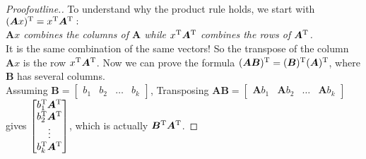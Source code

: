 \begin{proof}[Proofoutline.]
To understand why the product rule holds, we start with $(\bm{A}x)^{\mathrm T} = x^{\mathrm T}\bm A^{\mathrm T}:$\\
\emph{$\bm{A}x$ combines the columns of $\bm A$ while $x^{\mathrm T}\bm A^{\mathrm T}$ combines the rows of $\bm A^{\mathrm T}$.}\\
It is the same combination of the same vectors! So the transpose of the column $\bm{A}x$ is the row $x^{\mathrm T}\bm A^{\mathrm T}$. Now we can prove the formula $(\bm{AB})^{\mathrm T} = (\bm B)^{\mathrm T}(\bm A)^{\mathrm T}$, where $\bm B$ has several columns.\\
Assuming $\bm B = \left[
\begin{array}{c|c|c|c}
b_1&b_2&\ldots&b_k
\end{array}\right]$, Transposing $\bm{AB} = \left[
\begin{array}{c|c|c|c}
\bm Ab_1&\bm Ab_2&\ldots&\bm Ab_k
\end{array}\right]$ gives $\begin{bmatrix}
b_1^{\mathrm T}\bm A^{\mathrm T}\\b_2^{\mathrm T}\bm A^{\mathrm T}\\\vdots\\b_k^{\mathrm T}\bm A^{\mathrm T}
\end{bmatrix}$, which is actually $\bm B^{\mathrm T}\bm A^{\mathrm T}$.
\end{proof}
